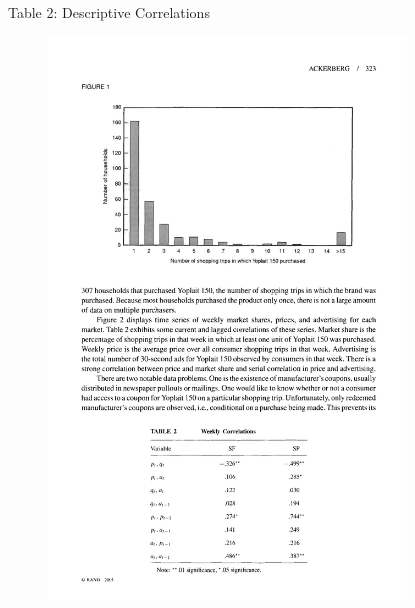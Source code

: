 \documentclass[xcolor=pdftex,dvipsnames,table,mathserif,aspectratio=169]{beamer}
\begin{document}
\begin{frame}{Table 2: Descriptive Correlations}
\begin{figure}[htbp]
\begin{center}
\includegraphics[width=9.5cm]{resources/acker2.pdf}
\label{default}
\end{center}
\end{figure}
\end{frame}
\end{document}
